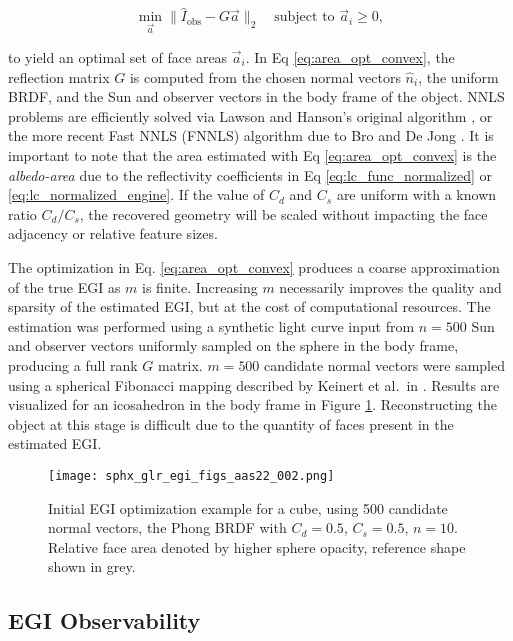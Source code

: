 \begin{equation} \label{eq:area_opt_convex}
  \min_{\vec{a}}{\|\hat{I}_{\textrm{obs}} - G \vec{a}\|_2} \:\:\: \textrm{ subject to } \vec{a}_i \geq 0,
\end{equation}

to yield an optimal set of face areas $\vec{a}_i$. In Eq \ref{eq:area_opt_convex}, the reflection matrix $G$ is computed from the chosen normal vectors $\hat{n}_i$, the uniform BRDF, and the Sun and observer vectors in the body frame of the object. NNLS problems are efficiently solved via Lawson and Hanson's original algorithm \cite{lawson1976}, or the more recent Fast NNLS (FNNLS) algorithm due to Bro and De Jong \cite{bro1996}. It is important to note that the area estimated with Eq \ref{eq:area_opt_convex} is the \textit{albedo-area} due to the reflectivity coefficients in Eq \ref{eq:lc_func_normalized} or \ref{eq:lc_normalized_engine}. If the value of $C_d$ and $C_s$ are uniform with a known ratio $C_d / C_s$, the recovered geometry will be scaled without impacting the face adjacency or relative feature sizes.

The optimization in Eq. \ref{eq:area_opt_convex} produces a coarse approximation of the true EGI as $m$ is finite. Increasing $m$ necessarily improves the quality and sparsity of the estimated EGI, but at the cost of computational resources. The estimation was performed using a synthetic light curve input from $n=500$ Sun and observer vectors uniformly sampled on the sphere in the body frame, producing a full rank $G$ matrix. $m = 500$ candidate normal vectors were sampled using a spherical Fibonacci mapping described by Keinert et al.\ in \cite{keinert2015}. Results are visualized for an icosahedron in the body frame in Figure \ref{fig:initial_egi_sampling}. Reconstructing the object at this stage is difficult due to the quantity of faces present in the estimated EGI. 

\graphicspath{{/Users/liamrobinson/Documents/PyLightCurves/docs/build/html/_images}}
\begin{figure}[!htb]
  \centering
  \texttt{[image: sphx\_glr\_egi\_figs\_aas22\_002.png]}
  \caption{Initial EGI optimization example for a cube, using 500 candidate normal vectors, the Phong BRDF with $C_d=0.5$, $C_s=0.5$, $n=10$. Relative face area denoted by higher sphere opacity, reference shape shown in grey.}
  \label{fig:initial_egi_sampling}
\end{figure}

\subsection{EGI Observability}

